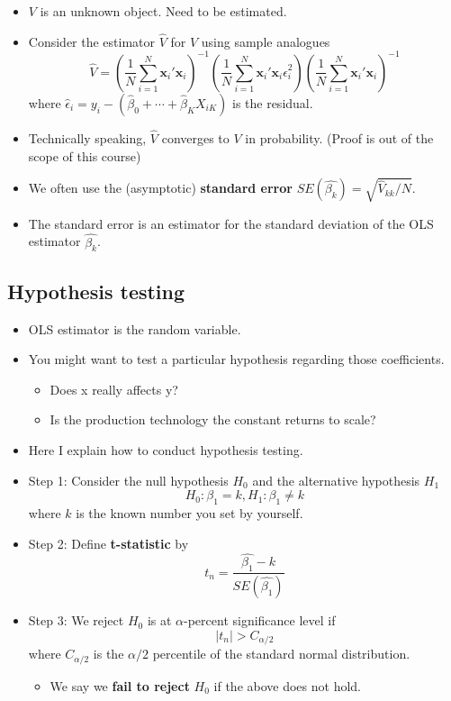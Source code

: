 \documentclass[]{book}
\providecommand{\tightlist}{%
  \setlength{\itemsep}{0pt}\setlength{\parskip}{0pt}}
\begin{document}
\begin{itemize}
\tightlist
\item
  \(V\) is an unknown object. Need to be estimated.
\item
  Consider the estimator \(\hat{V}\) for \(V\) using sample analogues \[
  \hat{V}=\left(\frac{1}{N}\sum_{i=1}^{N}\mathbf{x}_{i}'\mathbf{x}_{i}\right)^{-1}\left(\frac{1}{N}\sum_{i=1}^{N}\mathbf{x}_{i}'\mathbf{x}_{i}\hat{\epsilon}_{i}^{2}\right)\left(\frac{1}{N}\sum_{i=1}^{N}\mathbf{x}_{i}'\mathbf{x}_{i}\right)^{-1}
  \] where
  \(\hat{\epsilon}_i = y_i - (\hat{\beta}_0 + \cdots + \hat{\beta}_K X_{iK})\)
  is the residual.
\item
  Technically speaking, \(\hat{V}\) converges to \(V\) in probability.
  (Proof is out of the scope of this course)
\item
  We often use the (asymptotic) \textbf{standard error}
  \(SE(\hat{\beta_k}) = \sqrt{\hat{V}_{kk} / N }\).
\item
  The standard error is an estimator for the standard deviation of the
  OLS estimator \(\hat{\beta_k}\).
\end{itemize}

\subsection{Hypothesis testing}\label{hypothesis-testing-2}

\begin{itemize}
\item
  OLS estimator is the random variable.
\item
  You might want to test a particular hypothesis regarding those
  coefficients.

  \begin{itemize}
  \tightlist
  \item
    Does x really affects y?
  \item
    Is the production technology the constant returns to scale?
  \end{itemize}
\item
  Here I explain how to conduct hypothesis testing.
\item
  Step 1: Consider the null hypothesis \(H_{0}\) and the alternative
  hypothesis \(H_{1}\) \[
  H_{0}:\beta_{1}=k,H_{1}:\beta_{1}\neq k
  \] where \(k\) is the known number you set by yourself.
\item
  Step 2: Define \textbf{t-statistic} by \[
  t_{n}=\frac{\hat{\beta_1}-k}{SE(\hat{\beta_1})}
  \]
\item
  Step 3: We reject \(H_{0}\) is at \(\alpha\)-percent significance
  level if \[|t_{n}|>C_{\alpha/2} 
  \] where \(C_{\alpha/2}\) is the \(\alpha/2\) percentile of the
  standard normal distribution.

  \begin{itemize}
  \tightlist
  \item
    We say we \textbf{fail to reject} \(H_0\) if the above does not
    hold.
  \end{itemize}
\end{itemize}
\end{document}

